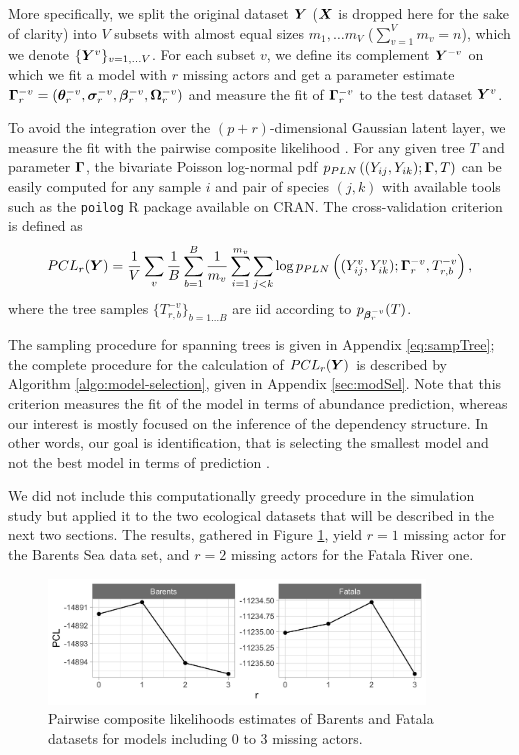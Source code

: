 More specifically, we split the original dataset ${\boldsymbol{Y}}$ (${\boldsymbol{X}}$ is dropped here for the sake of clarity) into $V$ subsets with almost equal sizes $m_1, \dots m_V$ ($\sum_{v=1}^V m_v = n$), which we denote $\{{\boldsymbol{Y}}^v\}_{v = 1, \dots V}$. For each subset $v$, we define its complement ${\boldsymbol{Y}}^{-v}$ on which we fit a model with $r$ missing actors and get a parameter estimate ${\boldsymbol{\Gamma}}_r^{-v} = ({\boldsymbol{\theta}}_r^{-v}, {\boldsymbol{\sigma}}_r^{-v}, {\boldsymbol{\beta}}^{-v}_r, {\boldsymbol{\Omega}}_r^{-v})$ and measure the fit of ${\boldsymbol{\Gamma}}_r^{-v}$ to the test dataset ${\boldsymbol{Y}}^v$. 

To avoid the integration over the $(p+r)$-dimensional Gaussian latent layer, we measure the fit with the pairwise composite likelihood \citep{lindsay}.
For any given tree $T$ and parameter ${\boldsymbol{\Gamma}}$, the bivariate Poisson log-normal pdf $p_{PLN}\left((Y_{ij}, Y_{ik}); {\boldsymbol{\Gamma}}, T \right)$ can be easily computed for any sample $i$ and pair of species $(j, k)$ with available tools such as the \texttt{poilog} R package \citep{ViS08} available on CRAN. The cross-validation criterion is defined as
$$
PCL_r({\boldsymbol{Y}}) = \frac1V \sum_v \frac1B \sum_{b=1}^B \frac1{m_v} \sum_{i = 1}^{m_v} \sum_{j < k} \log p_{PLN}\left((Y^v_{ij}, Y^v_{ik}); {\boldsymbol{\Gamma}}_r^{-v}, T_{r, b}^{-v} \right),
$$
where the tree samples $\{T_{r, b}^{-v}\}_{b=1 \dots B}$ are iid according to $p_{{\boldsymbol{\beta}}_r^{-v}}(T)$. 

The sampling procedure for spanning trees is given in Appendix \ref{eq:sampTree}; the complete procedure for the calculation of $PCL_r({\boldsymbol{Y}})$ is described by Algorithm \ref{algo:model-selection}, given in Appendix \ref{sec:modSel}. Note that this criterion measures the fit of the model in terms of abundance prediction, whereas our interest is mostly focused on the inference of the dependency structure. In other words, our goal is identification, that is selecting the smallest model  and not the best model in terms of prediction \citep{arlot2010survey}.


We did not include this computationally greedy procedure in the simulation study but applied it to the two ecological datasets that will be described in the next two sections. The results, gathered in Figure \ref{fig:selec}, yield $r=1$ missing actor for the Barents Sea data set, and $r=2$ missing actors for the Fatala River one.

\begin{figure}[H]
    \centering
    \includegraphics[width=10cm]{figs/selec_model_applis.png}
    \caption{Pairwise composite likelihoods estimates of Barents and Fatala datasets for models including 0 to 3 missing actors.}
    \label{fig:selec}
\end{figure}

